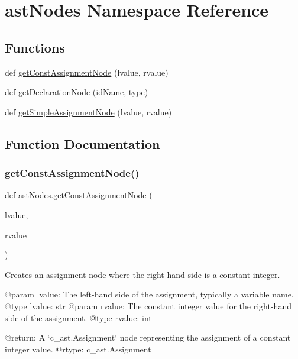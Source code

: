 \hypertarget{namespaceastNodes}{}\section{ast\+Nodes Namespace Reference}
\label{namespaceastNodes}
\subsection*{Functions}
\begin{DoxyCompactItemize}
\item 
def \hyperlink{namespaceastNodes_a95c339903d1831fd083d074239667d3e}{get\+Const\+Assignment\+Node} (lvalue, rvalue)
\item 
def \hyperlink{namespaceastNodes_ae5e5c7f09a1586002b20db6d72f6d30b}{get\+Declaration\+Node} (id\+Name, type)
\item 
def \hyperlink{namespaceastNodes_a2403f5d006e54f20e614226280cb6cbc}{get\+Simple\+Assignment\+Node} (lvalue, rvalue)
\end{DoxyCompactItemize}


\subsection{Function Documentation}
\mbox{\label{namespaceastNodes_a95c339903d1831fd083d074239667d3e}} 
\subsubsection{\texorpdfstring{get\+Const\+Assignment\+Node()}{getConstAssignmentNode()}}
{\footnotesize\ttfamily def ast\+Nodes.\+get\+Const\+Assignment\+Node (\begin{DoxyParamCaption}\item[{}]{lvalue,  }\item[{}]{rvalue }\end{DoxyParamCaption})}

\begin{DoxyVerb}Creates an assignment node where the right-hand side is a constant integer.

@param lvalue: The left-hand side of the assignment, typically a variable name.
@type lvalue: str
@param rvalue: The constant integer value for the right-hand side of the assignment.
@type rvalue: int

@return: A `c_ast.Assignment` node representing the assignment of a constant integer value.
@rtype: c_ast.Assignment
\end{DoxyVerb}
 

